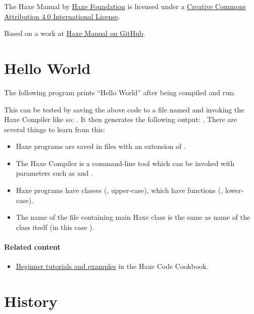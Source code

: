 The Haxe Manual by \href{http://haxe.org/foundation}{Haxe Foundation} is licensed under a \href{http://creativecommons.org/licenses/by/4.0/}{Creative Commons Attribution 4.0 International License}.

Based on a work at \href{https://github.com/HaxeFoundation/HaxeManual}{Haxe Manual on GitHub}.

\section{Hello World}
\label{introduction-hello-world}

The following program prints ``Hello World'' after being compiled and run:

This can be tested by saving the above code to a file named  and invoking the Haxe Compiler like so: . It then generates the following output: . There are several things to learn from this:

\begin{itemize}
	\item Haxe programs are saved in files with an extension of .
	\item The Haxe Compiler is a command-line tool which can be invoked with parameters such as  and .
	\item Haxe programs have classes (, upper-case), which have functions (, lower-case). 
	\item The name of the file containing main Haxe class is the same as name of the class itself (in this case ). 
\end{itemize}

\paragraph{Related content}
\begin{itemize}
	\item \href{http://code.haxe.org/category/beginner/}{Beginner tutorials and examples} in the Haxe Code Cookbook.
\end{itemize}

\section{History}
\label{introduction-haxe-history}

